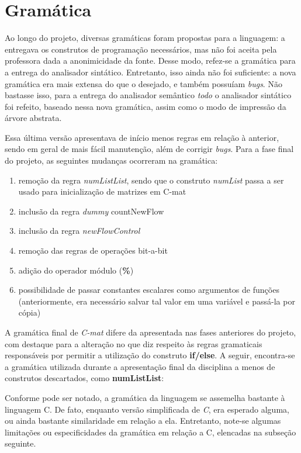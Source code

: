 \documentclass[
	article,			%
	11pt,				%
	oneside,			%
	a4paper,			%
	english,			%
	brazil,				%
	sumario=tradicional
	]{abntex2}
\renewcommand{\it}[1]{\textit{#1}}
\renewcommand{\bf}[1]{\textbf{#1}}
\begin{document}
\section{Gramática}

Ao longo do projeto, diversas gramáticas foram propostas para a linguagem: a entregava os construtos de programação necessários, mas não foi aceita pela professora dada a anonimicidade da fonte. Desse modo, refez-se a gramática para a entrega do analisador sintático. Entretanto, isso ainda não foi suficiente: a nova gramática era mais extensa do que o desejado, e também possuíam \it{bugs}. Não bastasse isso, para a entrega do analisador semântico \it{todo} o analisador sintático foi refeito, baseado nessa nova gramática, assim como o modo de impressão da árvore  abstrata.

Essa última versão apresentava de início menos regras em relação à anterior, sendo em geral de mais fácil manutenção, além de corrigir \it{bugs}. Para a fase final do projeto, as seguintes mudanças ocorreram na gramática:

\begin{enumerate}
	\item remoção da regra \it{numListList}, sendo que o construto \it{numList} passa a ser usado para inicialização de matrizes em C-mat
	\item inclusão da regra \it{dummy} countNewFlow
	\item inclusão da regra \it{newFlowControl}
	\item remoção das regras de operações bit-a-bit
	\item adição do operador módulo (\bf{\%})
	\item possibilidade de passar constantes escalares como argumentos de funções (anteriormente, era necessário salvar tal valor em uma variável e passá-la por cópia)
	
\end{enumerate}


A gramática final de \it{C-mat} difere da apresentada nas fases anteriores do projeto, com destaque para a alteração no que diz respeito às regras gramaticais responsáveis por permitir a utilização do construto \bf{if/else}. A seguir, encontra-se a gramática utilizada durante a apresentação final da disciplina a menos de construtos descartados, como \bf{numListList}:


Conforme pode ser notado, a gramática da linguagem se assemelha bastante à linguagem C. De fato, enquanto versão simplificada de \it{C}, era esperado alguma, ou ainda bastante similaridade em relação a ela. Entretanto, note-se algumas limitações ou especificidades da gramática em relação a C, elencadas na subseção seguinte.
\end{document}
